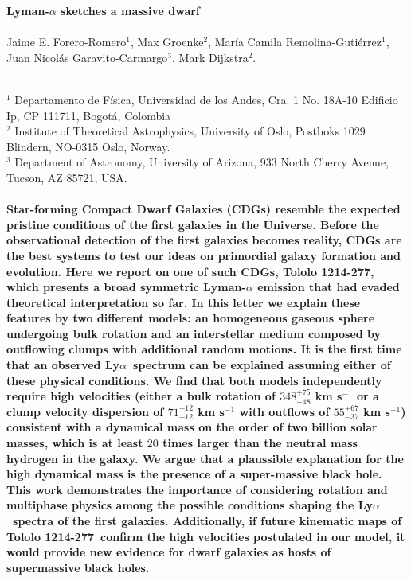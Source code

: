 \documentclass[a4paper, usenatbib, 12pt]{article}
\newcommand{\tol}{Tololo 1214-277}
\newcommand{\lya}{Ly$\alpha$}
\begin{document}
\pagestyle{empty}
\noindent
\textbf{Lyman-$\alpha$ sketches a massive dwarf}
\\
\\
Jaime E. Forero-Romero$^{1}$, Max Groenke$^2$, Mar\'ia Camila
Remolina-Guti\'errez$^1$, Juan Nicol\'as
Garavito-Carmargo$^3$, Mark Dijkstra$^2$.
\\
\\
\scriptsize
{$^1$ Departamento de Física, Universidad de los Andes, Cra. 1
  No. 18A-10 Edificio Ip, CP 111711, Bogot\'a, Colombia 
\\
$^2$ Institute of Theoretical Astrophysics, University of Oslo,
Postboks 1029 Blindern, NO-0315 Oslo, Norway.
\\
$^3$ Department of Astronomy, University of Arizona, 933 North Cherry
Avenue, Tucson, AZ 85721, USA. 
\normalsize
\\
\\
\textbf{
  Star-forming Compact Dwarf Galaxies (CDGs) resemble the expected
  pristine conditions of the first galaxies in the Universe.    
Before the observational detection of the first galaxies becomes
reality, CDGs are the best systems to test our ideas on primordial
galaxy formation and evolution.    
Here we report on one of such CDGs, \tol, which presents
a broad symmetric Lyman-$\alpha$ emission that had evaded theoretical
interpretation so far. 
In this letter we explain these features by two different models: an
homogeneous gaseous sphere undergoing bulk rotation and an interstellar
medium composed by outflowing clumps with additional random motions.
It is the first time that an observed \lya\ spectrum can be explained
assuming either of these physical conditions.
We find that both models independently require high velocities
(either a bulk rotation of $348^{+75}_{-48}$ km s$^{-1}$ or a clump velocity
dispersion of $71^{+12}_{-12}$ km s$^{-1}$ with outflows of
$55^{+67}_{-37}$ km s$^{-1}$) consistent with a dynamical mass on
the order of two billion solar masses, which is at least $20$ times
larger than the neutral mass hydrogen in the galaxy.   
We argue that a plaussible explanation for the high dynamical mass is
the presence of a super-massive black hole.  
This work demonstrates the importance of considering rotation and
multiphase physics among the possible conditions shaping the
\lya\ spectra of the first galaxies. 
Additionally, if future kinematic maps of \tol\ confirm the high
velocities postulated in our model, it would provide new
evidence for dwarf galaxies as hosts of supermassive black
holes.  
}  



}
\end{document}
